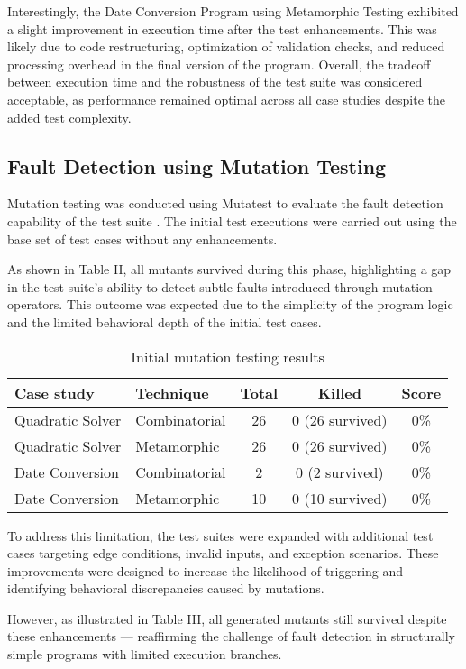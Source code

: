 \documentclass[conference]{IEEEtran}
\begin{document}
Interestingly, the Date Conversion Program using Metamorphic Testing exhibited a slight improvement in execution time after the test enhancements. This was likely due to code restructuring, optimization of validation checks, and reduced processing overhead in the final version of the program. Overall, the tradeoff between execution time and the robustness of the test suite was considered acceptable, as performance remained optimal across all case studies despite the added test complexity.

\subsection{Fault Detection using Mutation Testing}
Mutation testing was conducted using Mutatest to evaluate the fault detection capability of the test suite \cite{b5}. The initial test executions were carried out using the base set of test cases without any enhancements. 

As shown in Table II, all mutants survived during this phase, highlighting a gap in the test suite’s ability to detect subtle faults introduced through mutation operators. This outcome was expected due to the simplicity of the program logic and the limited behavioral depth of the initial test cases.

\begin{table}[htbp]
\caption{Initial mutation testing results}
\centering
\begin{tabular}{|l|l|c|c|c|}
\hline
Case study & Technique & Total & Killed & Score \\
\hline
Quadratic Solver & Combinatorial & 26 & 0 (26 survived) & 0\% \\
Quadratic Solver & Metamorphic & 26 & 0 (26 survived) & 0\% \\
Date Conversion & Combinatorial & 2  & 0 (2 survived)  & 0\% \\
Date Conversion & Metamorphic   & 10 & 0 (10 survived) & 0\% \\
\hline
\end{tabular}
\end{table}
    
To address this limitation, the test suites were expanded with additional test cases targeting edge conditions, invalid inputs, and exception scenarios. These improvements were designed to increase the likelihood of triggering and identifying behavioral discrepancies caused by mutations.

However, as illustrated in Table III, all generated mutants still survived despite these enhancements — reaffirming the challenge of fault detection in structurally simple programs with limited execution branches.
\end{document}
